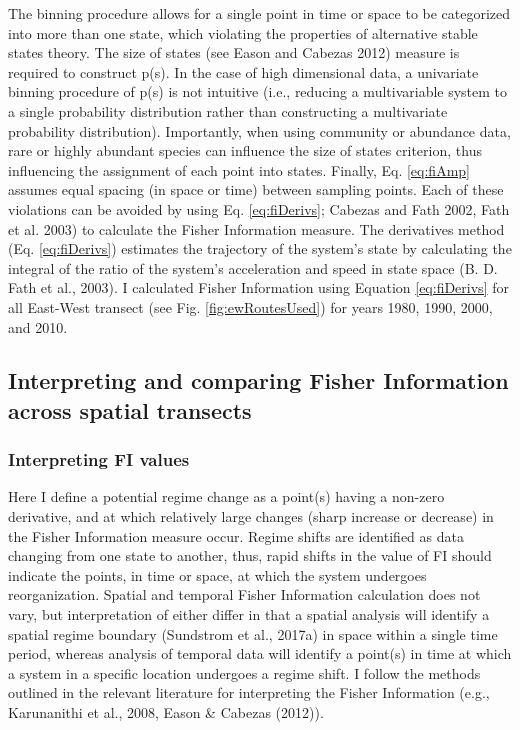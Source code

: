 \documentclass[12pt,twoside,openany]{reedthesis}
\begin{document}
The binning procedure allows for a single point in time or space to be
categorized into more than one state, which violating the properties of
alternative stable states theory. The size of states (see Eason and
Cabezas 2012) measure is required to construct p(s). In the case of high
dimensional data, a univariate binning procedure of p(s) is not
intuitive (i.e., reducing a multivariable system to a single probability
distribution rather than constructing a multivariate probability
distribution). Importantly, when using community or abundance data, rare
or highly abundant species can influence the size of states criterion,
thus influencing the assignment of each point into states. Finally, Eq.
\eqref{eq:fiAmp} assumes equal spacing (in space or time) between sampling
points. Each of these violations can be avoided by using Eq.
\eqref{eq:fiDerivs}; Cabezas and Fath 2002, Fath et al. 2003) to calculate
the Fisher Information measure. The derivatives method (Eq.
\eqref{eq:fiDerivs}) estimates the trajectory of the system's state by
calculating the integral of the ratio of the system's acceleration and
speed in state space (B. D. Fath et al., 2003). I calculated Fisher
Information using Equation \eqref{eq:fiDerivs} for all East-West transect
(see Fig. \ref{fig:ewRoutesUsed}) for years 1980, 1990, 2000, and 2010.

\subsection{Interpreting and comparing Fisher Information across spatial
transects}\label{interpreting-and-comparing-fisher-information-across-spatial-transects}

\subsubsection{Interpreting FI values}\label{interpreting-fi-values}

Here I define a potential regime change as a point(s) having a non-zero
derivative, and at which relatively large changes (sharp increase or
decrease) in the Fisher Information measure occur. Regime shifts are
identified as data changing from one state to another, thus, rapid
shifts in the value of FI should indicate the points, in time or space,
at which the system undergoes reorganization. Spatial and temporal
Fisher Information calculation does not vary, but interpretation of
either differ in that a spatial analysis will identify a spatial regime
boundary (Sundstrom et al., 2017a) in space within a single time period,
whereas analysis of temporal data will identify a point(s) in time at
which a system in a specific location undergoes a regime shift. I follow
the methods outlined in the relevant literature for interpreting the
Fisher Information (e.g., Karunanithi et al., 2008, Eason \& Cabezas
(2012)).
\end{document}
